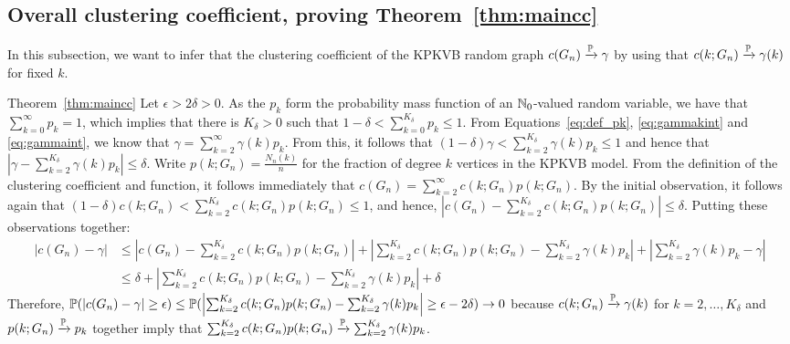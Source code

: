 \subsection{Overall clustering coefficient, proving Theorem~\ref{thm:maincc}}
In this subsection, we want to infer that the clustering coefficient of the KPKVB random graph $c(G_n) \xrightarrow{\mathbb{P}} \gamma$ by using that $c(k;G_n) \xrightarrow{\mathbb{P}} \gamma(k)$ for fixed $k$.

\begin{proofof}{Theorem~\ref{thm:maincc}}
Let $\epsilon >2\delta >0$.
As the $p_k$ form the probability mass function of an $\mathbb{N}_0$-valued random variable, we have that $\sum_{k=0}^\infty p_k = 1$, which implies that there is $K_\delta >0$ such that $1-\delta < \sum_{k=0}^{K_\delta} p_k \leq 1$.
From Equations~\ref{eq:def_pk}, \ref{eq:gammakint} and \ref{eq:gammaint}, we know that $\gamma = \sum_{k=2}^\infty \gamma(k)p_k$. 
From this, it follows that $(1-\delta)\gamma < \sum_{k=2}^{K_\delta} \gamma(k) p_k \leq 1$ and hence that $|\gamma - \sum_{k=2}^{K_\delta} \gamma(k)p_k| \leq \delta$. Write $p(k;G_n)=\frac{N_n(k)}{n}$ for the fraction of degree $k$ vertices in the KPKVB model. From the definition of the clustering coefficient and function, it follows immediately that $c(G_n) = \sum_{k=2}^\infty c(k;G_n)p(k;G_n)$. By the initial observation, it follows again that $(1-\delta)c(k;G_n) < \sum_{k=2}^{K_\delta} c(k;G_n)p(k;G_n) \leq 1$, and hence, $|c(G_n)-\sum_{k=2}^{K_\delta} c(k;G_n)p(k;G_n)| \leq \delta$.
Putting these observations together:
\begin{align*}
|c(G_n)-\gamma| &\leq \left|c(G_n)-\sum_{k=2}^{K_\delta}c(k;G_n)p(k;G_n)\right|+\left|\sum_{k=2}^{K_\delta} c(k;G_n)p(k;G_n) -\sum_{k=2}^{K_\delta} \gamma(k)p_k\right| +\left|\sum_{k=2}^{K_\delta} \gamma(k)p_k-\gamma\right| \\
 &\leq \delta +\left|\sum_{k=2}^{K_\delta} c(k;G_n)p(k;G_n) -\sum_{k=2}^{K_\delta} \gamma(k)p_k\right| +\delta 
\end{align*}
Therefore, $\mathbb{P}(|c(G_n)-\gamma|\geq \epsilon) \leq \mathbb{P}(\left|\sum_{k=2}^{K_\delta} c(k;G_n)p(k;G_n) -\sum_{k=2}^{K_\delta} \gamma(k)p_k\right| \geq \epsilon - 2\delta) \rightarrow 0$ because $c(k;G_n) \xrightarrow{\mathbb{P}} \gamma(k)$ for $k=2,\dots,K_\delta$ and $p(k;G_n) \xrightarrow{\mathbb{P}} p_k$ together imply that $\sum_{k=2}^{K_\delta} c(k;G_n)p(k;G_n) \xrightarrow{\mathbb{P}} \sum_{k=2}^{K_\delta} \gamma(k) p_k$. %
\end{proofof}



